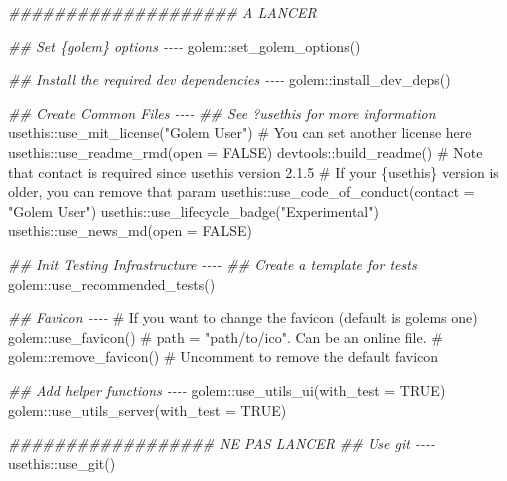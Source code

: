 \documentclass[
  letterpaper,
  DIV=11,
  numbers=noendperiod]{scrreprt}
\newenvironment{Shaded}{\begin{snugshade}}{\end{snugshade}}
\newcommand{\AttributeTok}[1]{\textcolor[rgb]{0.40,0.45,0.13}{#1}}
\newcommand{\CommentTok}[1]{\textcolor[rgb]{0.37,0.37,0.37}{#1}}
\newcommand{\ConstantTok}[1]{\textcolor[rgb]{0.56,0.35,0.01}{#1}}
\newcommand{\DocumentationTok}[1]{\textcolor[rgb]{0.37,0.37,0.37}{\textit{#1}}}
\newcommand{\FunctionTok}[1]{\textcolor[rgb]{0.28,0.35,0.67}{#1}}
\newcommand{\NormalTok}[1]{\textcolor[rgb]{0.00,0.23,0.31}{#1}}
\newcommand{\SpecialCharTok}[1]{\textcolor[rgb]{0.37,0.37,0.37}{#1}}
\newcommand{\StringTok}[1]{\textcolor[rgb]{0.13,0.47,0.30}{#1}}
\begin{document}
\begin{Shaded}
\begin{Highlighting}[]
\DocumentationTok{\#\#\#\#\#\#\#\#\#\#\#\#\#\#\#\#\#\#\#\# A LANCER}

\DocumentationTok{\#\# Set \{golem\} options {-}{-}{-}{-}}
\NormalTok{golem}\SpecialCharTok{::}\FunctionTok{set\_golem\_options}\NormalTok{()}

\DocumentationTok{\#\# Install the required dev dependencies {-}{-}{-}{-}}
\NormalTok{golem}\SpecialCharTok{::}\FunctionTok{install\_dev\_deps}\NormalTok{()}

\DocumentationTok{\#\# Create Common Files {-}{-}{-}{-}}
\DocumentationTok{\#\# See ?usethis for more information}
\NormalTok{usethis}\SpecialCharTok{::}\FunctionTok{use\_mit\_license}\NormalTok{(}\StringTok{"Golem User"}\NormalTok{) }\CommentTok{\# You can set another license here}
\NormalTok{usethis}\SpecialCharTok{::}\FunctionTok{use\_readme\_rmd}\NormalTok{(}\AttributeTok{open =} \ConstantTok{FALSE}\NormalTok{)}
\NormalTok{devtools}\SpecialCharTok{::}\FunctionTok{build\_readme}\NormalTok{()}
\CommentTok{\# Note that \textasciigrave{}contact\textasciigrave{} is required since usethis version 2.1.5}
\CommentTok{\# If your \{usethis\} version is older, you can remove that param}
\NormalTok{usethis}\SpecialCharTok{::}\FunctionTok{use\_code\_of\_conduct}\NormalTok{(}\AttributeTok{contact =} \StringTok{"Golem User"}\NormalTok{)}
\NormalTok{usethis}\SpecialCharTok{::}\FunctionTok{use\_lifecycle\_badge}\NormalTok{(}\StringTok{"Experimental"}\NormalTok{)}
\NormalTok{usethis}\SpecialCharTok{::}\FunctionTok{use\_news\_md}\NormalTok{(}\AttributeTok{open =} \ConstantTok{FALSE}\NormalTok{)}


\DocumentationTok{\#\# Init Testing Infrastructure {-}{-}{-}{-}}
\DocumentationTok{\#\# Create a template for tests}
\NormalTok{golem}\SpecialCharTok{::}\FunctionTok{use\_recommended\_tests}\NormalTok{()}

\DocumentationTok{\#\# Favicon {-}{-}{-}{-}}
\CommentTok{\# If you want to change the favicon (default is golem\textquotesingle{}s one)}
\NormalTok{golem}\SpecialCharTok{::}\FunctionTok{use\_favicon}\NormalTok{() }\CommentTok{\# path = "path/to/ico". Can be an online file.}
\CommentTok{\# golem::remove\_favicon() \# Uncomment to remove the default favicon}

\DocumentationTok{\#\# Add helper functions {-}{-}{-}{-}}
\NormalTok{golem}\SpecialCharTok{::}\FunctionTok{use\_utils\_ui}\NormalTok{(}\AttributeTok{with\_test =} \ConstantTok{TRUE}\NormalTok{)}
\NormalTok{golem}\SpecialCharTok{::}\FunctionTok{use\_utils\_server}\NormalTok{(}\AttributeTok{with\_test =} \ConstantTok{TRUE}\NormalTok{)}

\DocumentationTok{\#\#\#\#\#\#\#\#\#\#\#\#\#\#\#\#\#\# NE PAS LANCER}
\DocumentationTok{\#\# Use git {-}{-}{-}{-}}
\NormalTok{usethis}\SpecialCharTok{::}\FunctionTok{use\_git}\NormalTok{()}
\end{Highlighting}
\end{Shaded}
\end{document}
